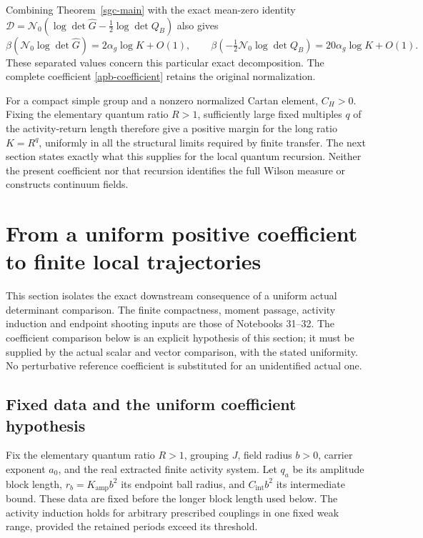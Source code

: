 \documentclass[11pt]{article}
\theoremstyle{remark}
\begin{document}
Combining Theorem~\ref{sgc-main} with the exact mean-zero identity
\(\mathcal D=\mathcal N_0(\log\det\widehat G
-\tfrac12\log\det Q_B)\) also gives
\[
 \beta(\mathcal N_0\log\det\widehat G)
       =2\alpha_g\log K+O(1),\qquad
 \beta(-\tfrac12\mathcal N_0\log\det Q_B)
       =20\alpha_g\log K+O(1).
\]
These separated values concern this particular exact decomposition.
The complete coefficient \eqref{apb-coefficient} retains the original
normalization.

For a compact simple group and a nonzero normalized Cartan element,
\(C_H>0\). Fixing the elementary quantum ratio \(R>1\), sufficiently
large fixed multiples \(q\) of the activity-return length therefore
give a positive margin for the long ratio \(K=R^q\), uniformly in
all the structural limits required by finite transfer. The next
section states exactly what this supplies for the local quantum
recursion. Neither the present coefficient nor that recursion
identifies the full Wilson measure or constructs continuum fields.


\section{From a uniform positive coefficient to finite local trajectories}
\label{lpd-section}

This section isolates the exact downstream consequence of a uniform
actual determinant comparison. The finite compactness, moment passage,
activity induction and endpoint shooting inputs are those of
Notebooks 31--32. The coefficient comparison below is an explicit
hypothesis of this section; it must be supplied by the actual scalar
and vector comparison, with the stated uniformity. No perturbative
reference coefficient is substituted for an unidentified actual one.

\subsection{Fixed data and the uniform coefficient hypothesis}
\label{lpd-data}

Fix the elementary quantum ratio \(R>1\), grouping \(J\), field
radius \(b>0\), carrier exponent \(a_0\), and the real extracted
finite activity system. Let \(q_a\) be its amplitude block length,
\(r_b=K_{\mathrm{amp}}b^2\) its endpoint ball radius, and
\(C_{\mathrm{int}}b^2\) its intermediate bound. These data are fixed
before the longer block length used below. The activity induction
holds for arbitrary prescribed couplings in one fixed weak range,
provided the retained periods exceed its threshold.
\end{document}
